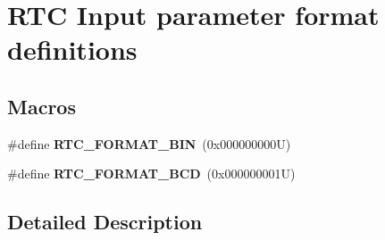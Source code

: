 \hypertarget{group___r_t_c___input__parameter__format__definitions}{}\section{R\+TC Input parameter format definitions}
\label{group___r_t_c___input__parameter__format__definitions}
\subsection*{Macros}
\begin{DoxyCompactItemize}
\item 
\mbox{\label{group___r_t_c___input__parameter__format__definitions_gadf5ce0bf2d5b4814fb3911f63d7ffb17}} 
\#define {\bfseries R\+T\+C\+\_\+\+F\+O\+R\+M\+A\+T\+\_\+\+B\+IN}~(0x000000000\+U)
\item 
\mbox{\label{group___r_t_c___input__parameter__format__definitions_ga20d772c2e0ba75287a3655780fd0c39b}} 
\#define {\bfseries R\+T\+C\+\_\+\+F\+O\+R\+M\+A\+T\+\_\+\+B\+CD}~(0x000000001\+U)
\end{DoxyCompactItemize}


\subsection{Detailed Description}
